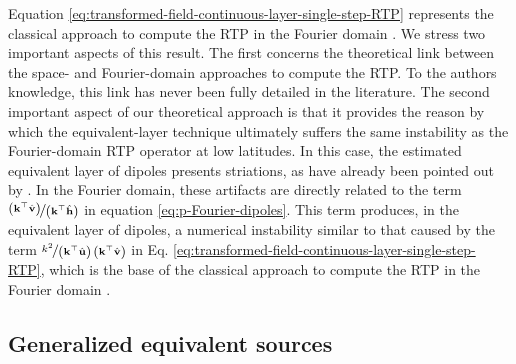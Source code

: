 Equation \ref{eq:transformed-field-continuous-layer-single-step-RTP} represents the
classical approach to compute the RTP in the Fourier domain \citep[e.g.,][p. 331]{blakely1996}.
We stress two important aspects of this result. The first concerns the theoretical link 
between the space- and Fourier-domain approaches to compute the RTP. To the authors knowledge, this link has never been fully 
detailed in the literature.
The second important aspect of our theoretical approach is that it provides the 
reason by which the equivalent-layer technique ultimately suffers the same instability as 
the Fourier-domain RTP operator at low latitudes. In this case, the estimated equivalent layer of dipoles 
presents striations, as have already been pointed out by \cite{li_etal2014}. 
In the Fourier domain, these artifacts are directly related to the term 
$\nicefrac{\left(\mathbf{k}^{\top} \hat{\mathbf{v}} \right)}{\left(\mathbf{k}^{\top} \hat{\mathbf{h}} \right)}$ 
in equation \ref{eq:p-Fourier-dipoles}. This term produces, in the equivalent layer of dipoles, a 
numerical instability similar to that caused by the term 
$\nicefrac{k^{2}}{\left(\mathbf{k}^{\top} \hat{\mathbf{u}} \right) \, \left(\mathbf{k}^{\top} \hat{\mathbf{v}} \right)}$ in Eq. 
\ref{eq:transformed-field-continuous-layer-single-step-RTP},
which is the base of the classical approach to compute the RTP in the Fourier domain \citep[e.g.,][p. 331]{blakely1996}.

\subsection{Generalized equivalent sources}

